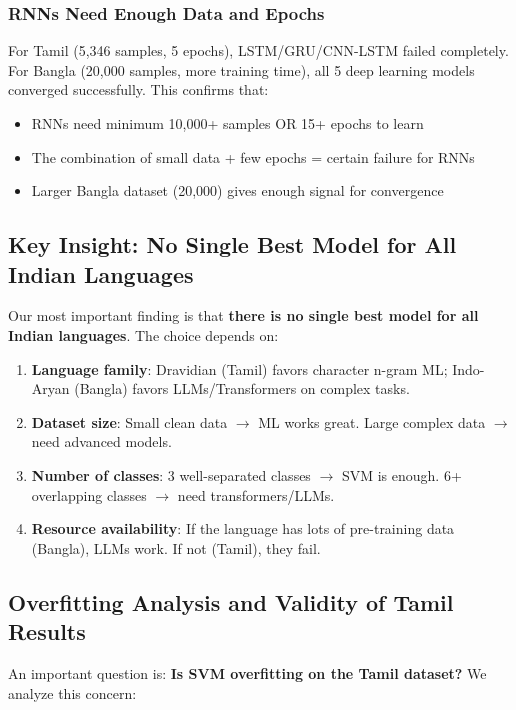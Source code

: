 \documentclass[conference]{IEEEtran}
\begin{document}
\subsubsection{RNNs Need Enough Data and Epochs}

For Tamil (5,346 samples, 5 epochs), LSTM/GRU/CNN-LSTM failed completely. For Bangla (20,000 samples, more training time), all 5 deep learning models converged successfully. This confirms that:
\begin{itemize}
\item RNNs need minimum 10,000+ samples OR 15+ epochs to learn
\item The combination of small data + few epochs = certain failure for RNNs
\item Larger Bangla dataset (20,000) gives enough signal for convergence
\end{itemize}

\subsection{Key Insight: No Single Best Model for All Indian Languages}

Our most important finding is that \textbf{there is no single best model for all Indian languages}. The choice depends on:

\begin{enumerate}
\item \textbf{Language family}: Dravidian (Tamil) favors character n-gram ML; Indo-Aryan (Bangla) favors LLMs/Transformers on complex tasks.
\item \textbf{Dataset size}: Small clean data $\rightarrow$ ML works great. Large complex data $\rightarrow$ need advanced models.
\item \textbf{Number of classes}: 3 well-separated classes $\rightarrow$ SVM is enough. 6+ overlapping classes $\rightarrow$ need transformers/LLMs.
\item \textbf{Resource availability}: If the language has lots of pre-training data (Bangla), LLMs work. If not (Tamil), they fail.
\end{enumerate}

\subsection{Overfitting Analysis and Validity of Tamil Results}

An important question is: \textbf{Is SVM overfitting on the Tamil dataset?} We analyze this concern:
\end{document}
